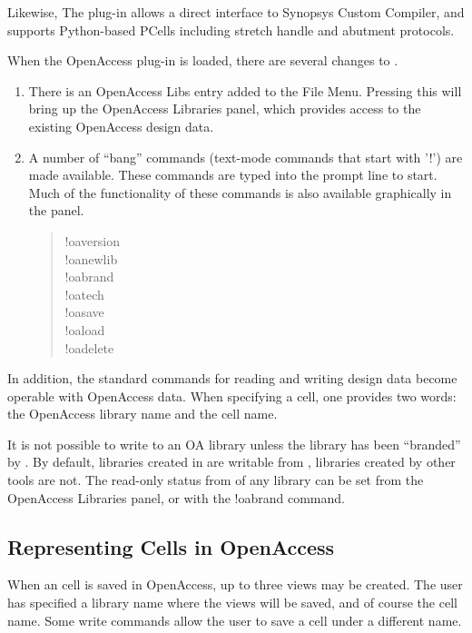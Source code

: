 Likewise, The plug-in allows a direct interface to Synopsys Custom
Compiler, and supports Python-based PCells including stretch handle
and abutment protocols.

When the OpenAccess plug-in is loaded, there are several changes to
{\Xic}.

\begin{enumerate}
\item{There is an {\cb OpenAccess Libs} entry added to the {\cb File
Menu}.  Pressing this will bring up the {\cb OpenAccess Libraries}
panel, which provides access to the existing OpenAccess design data.}

\item{A number of ``bang'' commands (text-mode commands that start
with '!') are made available.  These commands are typed into the
prompt line to start.  Much of the functionality of these commands is
also available graphically in the panel.
\begin{quote}
{\cb !oaversion}\\
{\cb !oanewlib}\\
{\cb !oabrand}\\
{\cb !oatech}\\
{\cb !oasave}\\
{\cb !oaload}\\
{\cb !oadelete}
\end{quote}
}
\end{enumerate}

In addition, the standard commands for reading and writing design data
become operable with OpenAccess data.  When specifying a cell, one
provides two words:  the OpenAccess library name and the cell name.

It is not possible to write to an OA library unless the library has
been ``branded'' by {\Xic}.  By default, libraries created in {\Xic}
are writable from {\Xic}, libraries created by other tools are not. 
The read-only status from {\Xic} of any library can be set from the
{\cb OpenAccess Libraries} panel, or with the {\cb !oabrand} command.

\subsection{Representing {\Xic} Cells in OpenAccess}

When an {\Xic} cell is saved in OpenAccess, up to three views may be
created.  The user has specified a library name where the views will
be saved, and of course the cell name.  Some write commands allow the
user to save a cell under a different name.


